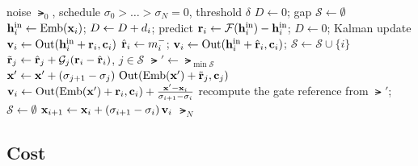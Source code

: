 \begin{algorithm}[t]
  \caption{\ours sampling. The second \textbf{if} block is \pcgs; without it, the procedure is the predictor
  alone (\kalsea).}
  \label{alg:kalsea}
  \small
  \begin{algorithmic}[1]
    \Require noise $\lat_0$, schedule $\sigma_0>\dots>\sigma_N=0$, threshold $\delta$
    \State $D\gets0$;\; gap $\mathcal S\gets\emptyset$
      \State $\mathbf{h}^{\mathrm{in}}_i\gets\operatorname{Emb}(\mathbf{x}_i)$;\; $D\gets D+d_i$;\; predict \Comment{\eqref{eq:sea},\,\eqref{eq:predict}}
       
        \State $\mathbf{r}_i\gets\mathcal{F}(\mathbf{h}^{\mathrm{in}}_i)-\mathbf{h}^{\mathrm{in}}_i$;\; $D\gets0$;\; Kalman update \Comment{\eqref{eq:update}}
        \State $\mathbf{v}_i\gets\operatorname{Out}(\mathbf{h}^{\mathrm{in}}_i+\mathbf{r}_i,\mathbf{c}_i)$
      \Else {}
        \State $\hat{\mathbf{r}}_i\gets m^{-}_i$;\; $\mathbf{v}_i\gets\operatorname{Out}(\mathbf{h}^{\mathrm{in}}_i+\hat{\mathbf{r}}_i,\mathbf{c}_i)$;\; $\mathcal S\gets\mathcal S\cup\{i\}$
      \EndIf
        \State $\tilde{\mathbf{r}}_j\gets\hat{\mathbf{r}}_j+\mathcal G_j(\mathbf{r}_i-\hat{\mathbf{r}}_i)$, $j\in\mathcal S$ \Comment{\eqref{eq:smooth-res}}
        \State $\lat'\gets\lat_{\min\mathcal S}$ \Comment{\eqref{eq:reint}}
          \State $\mathbf{x}'\gets\mathbf{x}'+(\sigma_{j+1}-\sigma_j)\,\operatorname{Out}(\operatorname{Emb}(\mathbf{x}')+\tilde{\mathbf{r}}_j,\mathbf{c}_j)$
        \EndFor
        \State $\mathbf{v}_i\gets\operatorname{Out}(\operatorname{Emb}(\mathbf{x}')+\mathbf{r}_i,\mathbf{c}_i)+\frac{\mathbf{x}'-\mathbf{x}_i}{\sigma_{i+1}-\sigma_i}$ \Comment{\eqref{eq:offset}}
        \State recompute the gate reference from $\lat'$;\; $\mathcal S\gets\emptyset$
      \EndIf
      \State $\mathbf{x}_{i+1}\gets\mathbf{x}_i+(\sigma_{i+1}-\sigma_i)\,\mathbf{v}_i$ 
    \EndFor
    \State \Return $\lat_N$
  \end{algorithmic}
\end{algorithm}

\subsection{Cost}
\label{sec:cost}

